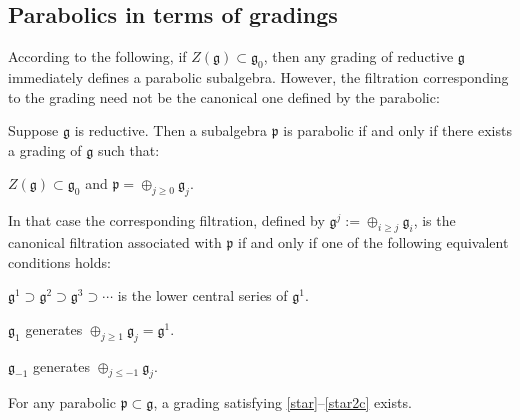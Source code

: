 \documentclass[leqno,12pt]{amsart} %
\begin{document}

\subsection{Parabolics in terms of gradings}\label{in_terms_of_gradings}
According to the following, if $Z({\mathfrak g}) \subset {\mathfrak g}_0$, then any
grading of reductive ${\mathfrak g} $ immediately defines a parabolic subalgebra. However,
the filtration corresponding to the grading need not be the canonical one defined by the
parabolic:
\begin{proposition}
  Suppose ${\mathfrak g}$ is reductive. Then a subalgebra ${\mathfrak p} $ is parabolic if
  and only if there exists a grading of ${\mathfrak g} $ such that:
  \begin{conditions}
    \item\label{star} $Z({\mathfrak g}) \subset {\mathfrak g}_0$ and
  ${\mathfrak p} = \oplus_{j\ge 0} {\mathfrak g}_j$.
  \end{conditions}
   In that case the corresponding
   filtration, defined by ${\mathfrak g}^j:=\oplus_{i\ge j}{\mathfrak g}_i$, is the
   canonical filtration associated with ${\mathfrak p} $ if and only if one of the following   equivalent conditions holds:
   \begin{conditions}
   \item\label{star2}
     ${\mathfrak g}^1 \supset {\mathfrak g}^2 \supset {\mathfrak g}^3 \supset \cdots $ is
     the lower central series of ${\mathfrak g}^1$.
   \item \label{star2b} ${\mathfrak g}_1$ generates
     $\oplus_{j\ge 1}{\mathfrak g}_j={\mathfrak g}^1$.
   \item \label{star2c} ${\mathfrak g}_{-1}$ generates $\oplus_{j\le -1}{\mathfrak g}_j$.
   \end{conditions}
   For any parabolic ${\mathfrak p} \subset {\mathfrak g} $, a grading satisfying
   \eqref{star}--\eqref{star2c} exists.
\end{proposition}
\end{document}
